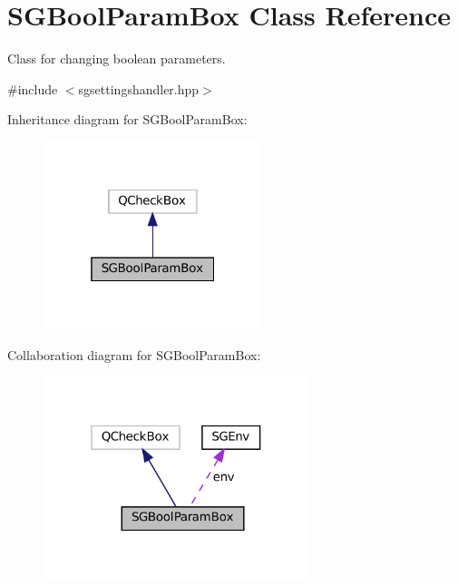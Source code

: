 \hypertarget{classSGBoolParamBox}{}\section{S\+G\+Bool\+Param\+Box Class Reference}
\label{classSGBoolParamBox}


Class for changing boolean parameters.  




{\ttfamily \#include $<$sgsettingshandler.\+hpp$>$}



Inheritance diagram for S\+G\+Bool\+Param\+Box\+:
\nopagebreak
\begin{figure}[H]
\begin{center}
\leavevmode
\includegraphics[width=181pt]{classSGBoolParamBox__inherit__graph}
\end{center}
\end{figure}


Collaboration diagram for S\+G\+Bool\+Param\+Box\+:
\nopagebreak
\begin{figure}[H]
\begin{center}
\leavevmode
\includegraphics[width=220pt]{classSGBoolParamBox__coll__graph}
\end{center}
\end{figure}
